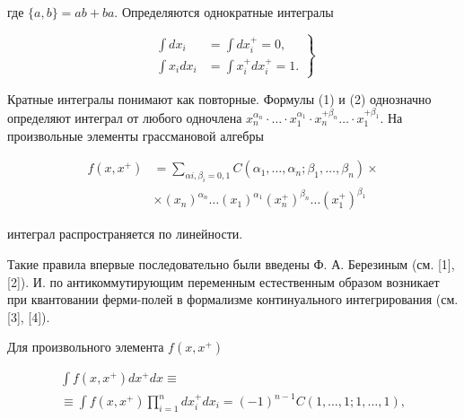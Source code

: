 \documentclass[10pt]{article}
\begin{document}
где $\{a, b\}=a b+b a$. Определяются однократные интегралы



\[

\left.\begin{array}{rl}

\int d x_{i} & =\int d x_{i}^{+}=0, \\

\int x_{i} d x_{i} & =\int x_{i}^{+} d x_{i}^{+}=1 .

\end{array}\right\}

\]



Кратные интегралы понимают как повторные. Формулы (1) и (2) однозначно определяют интеграл от любого одночлена $x_{n}^{\alpha_{n}} \cdot \ldots \cdot x_{1}^{\alpha_{1}} \cdot x_{n}^{+\beta_{n}} \ldots \cdot x_{1}^{+\beta_{1}}$. На произвольные элементы грассмановой алгебры



\[

\begin{aligned}

f\left(x, x^{+}\right) & =\sum_{\alpha i, \beta_{i}=0,1} C\left(\alpha_{1}, \ldots, \alpha_{n} ; \beta_{1}, \ldots, \beta_{n}\right) \times \\

& \times\left(x_{n}\right)^{\alpha_{n}} \ldots\left(x_{1}\right)^{\alpha_{1}}\left(x_{n}^{+}\right)^{\beta_{n}} \ldots\left(x_{1}^{+}\right)^{\beta_{1}}

\end{aligned}

\]



интеграл распространяется по линейности.



Такие правила впервые последовательно были введены Ф. А. Березиным (см. [1], [2]). И. по антикоммутирующим переменным естественным образом возникает при квантовании ферми-полей в формализме континуального интегрирования (см. [3], [4]).



Для произвольного элемента $f\left(x, x^{+}\right)$



\[

\begin{gathered}

\int f\left(x, x^{+}\right) d x^{+} d x \equiv \\

\equiv \int f\left(x, x^{+}\right) \prod_{i=1}^{n} d x_{i}^{+} d x_{i}=(-1)^{n-1} C(1, \ldots, 1 ; 1, \ldots, 1),

\end{gathered}

\]
\end{document}
